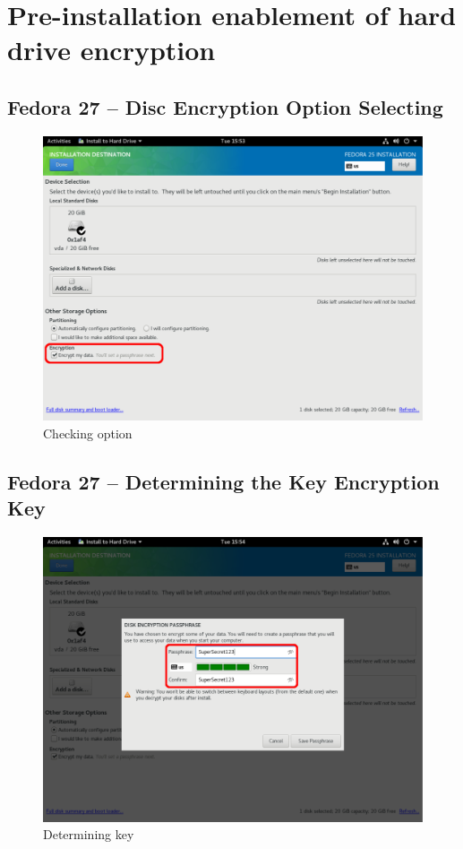 \chapter{Pre-installation enablement of hard drive encryption}
\label{luksinstall}

\section{Fedora 27 -- Disc Encryption Option Selecting}

\begin{figure}[H]
    \centering
    \includegraphics[scale=0.42]{figures/FedoraInstall1.pdf}
    \caption{Checking option}
\end{figure}

\newpage

\section{Fedora 27 -- Determining the Key Encryption Key}

\begin{figure}[H]
    \centering
    \includegraphics[scale=0.42]{figures/FedoraInstall2.pdf}
    \caption{Determining key}
\end{figure}
